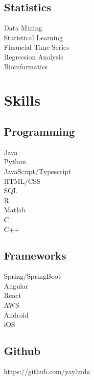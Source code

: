 \documentclass[letterpaper]{deedy-resume-openfont} %
\begin{document}
\begin{minipage}[t]{0.29\textwidth}
\sectionsep %

\subsection{Statistics}
\textbullet{} Data Mining\\
\textbullet{} Statistical Learning\\
\textbullet{} Financial Time Series\\
\textbullet{} Regression Analysis\\
\textbullet{} Bioinformatics\\

\sectionsep %


\section{Skills}

\subsection{Programming}

\textbullet{} Java\\
\textbullet{} Python\\
\textbullet{} JavaScript/Typescript\\
\textbullet{} HTML/CSS\\
\textbullet{} SQL\\
\textbullet{} R\\
\textbullet{} Matlab\\
\textbullet{} C\\
\textbullet{} C++

\sectionsep %

\subsection{Frameworks}
\textbullet{} Spring/SpringBoot\\
\textbullet{} Angular\\
\textbullet{} React\\
\textbullet{} AWS\\
\textbullet{} Android\\
\textbullet{} iOS\\

\sectionsep %

\subsection{Github}
\textbullet{} https://github.com/yaylinda


\end{minipage} %
\end{document}
